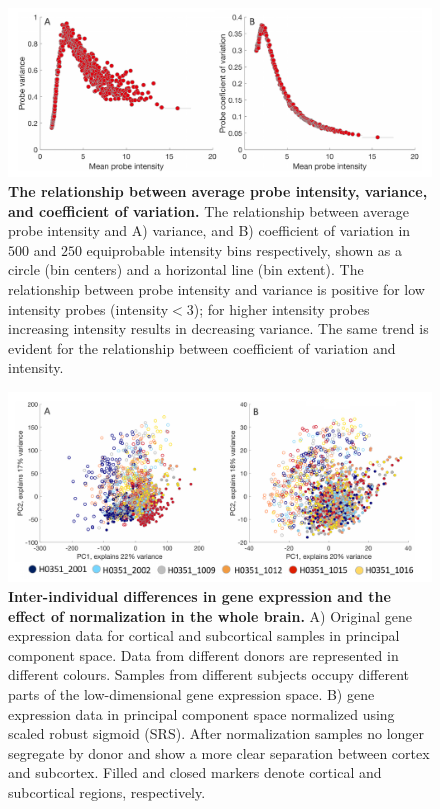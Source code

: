 \documentclass[10pt,A4]{article}
\begin{document}
\begin{figure}[h!]
  \centering
    \includegraphics[width=1\textwidth]{FigureS4.pdf}
\caption{\textbf{The relationship between average probe intensity, variance, and coefficient of variation.}
The relationship between average probe intensity and A) variance, and B) coefficient of variation in $500$ and $250$ equiprobable intensity bins respectively, shown as a circle (bin centers) and a horizontal line (bin extent). The relationship between probe intensity and variance is positive for low intensity probes (intensity$<3$); for higher intensity probes increasing intensity results in decreasing variance. The same trend is evident for the relationship between coefficient of variation and intensity.}
\label{fig:Ch4Sfig4}
\end{figure}

\begin{figure}[h!]
  \centering
    \includegraphics[width=1\textwidth]{FigureS5.pdf}
\caption{\textbf{Inter-individual differences in gene expression and the effect of normalization in the whole brain.}
A) Original gene expression data for cortical and subcortical samples in principal component space. Data from different donors are represented in different colours. Samples from different subjects occupy different parts of the low-dimensional gene expression space. B) gene expression data in principal component space normalized using scaled robust sigmoid (SRS). After normalization samples no longer segregate by donor and show a more clear separation between cortex and subcortex. Filled and closed markers denote cortical and subcortical regions, respectively.}
\label{fig:Ch4Sfig5}
\end{figure}
\end{document}
